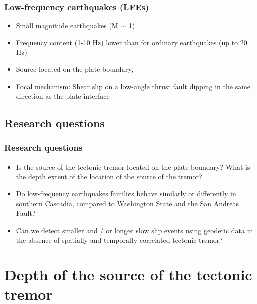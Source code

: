 \documentclass{beamer}
\begin{document}
	\begin{frame}
		\frametitle{Low-frequency earthquakes (LFEs)}
		\begin{itemize}
			\item Small magnitude earthquakes (M $\sim$ 1)
			\item Frequency content (1-10 Hz) lower than for ordinary earthquakes (up to 20 Hz)
			\item Source located on the plate boundary,
			\item Focal mechanism: Shear slip on a low-angle thrust fault dipping in the same direction as the plate interface
		\end{itemize}
	\end{frame}

	
	\subsection{Research questions}

	\begin{frame}
		\frametitle{Research questions}
		\begin{itemize}
			\item Is the source of the tectonic tremor located on the plate boundary? What is the depth extent of the location of the source of the tremor?
			\item Do low-frequency earthquakes families behave similarly or differently in southern Cascadia, compared to Washington State and the San Andreas Fault?
			\item Can we detect smaller and / or longer slow slip events using geodetic data in the absence of spatially and temporally correlated tectonic tremor?
		\end{itemize}
	\end{frame}

				
	\section{Depth of the source of the tectonic tremor}
\end{document}
